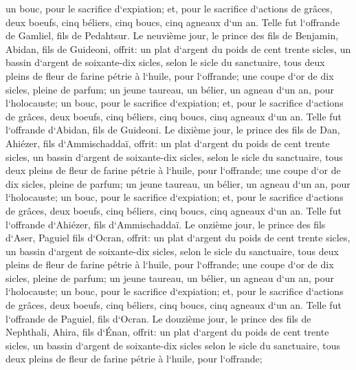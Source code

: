 \verse un bouc, pour le sacrifice d`expiation; 
\verse et, pour le sacrifice d`actions de grâces, deux boeufs, cinq béliers, cinq boucs, cinq agneaux d`un an. Telle fut l`offrande de Gamliel, fils de Pedahtsur. 
\verse Le neuvième jour, le prince des fils de Benjamin, Abidan, fils de Guideoni, 
\verse offrit: un plat d`argent du poids de cent trente sicles, un bassin d`argent de soixante-dix sicles, selon le sicle du sanctuaire, tous deux pleins de fleur de farine pétrie à l`huile, pour l`offrande; 
\verse une coupe d`or de dix sicles, pleine de parfum; 
\verse un jeune taureau, un bélier, un agneau d`un an, pour l`holocauste; 
\verse un bouc, pour le sacrifice d`expiation; 
\verse et, pour le sacrifice d`actions de grâces, deux boeufs, cinq béliers, cinq boucs, cinq agneaux d`un an. Telle fut l`offrande d`Abidan, fils de Guideoni. 
\verse Le dixième jour, le prince des fils de Dan, Ahiézer, fils d`Ammischaddaï, 
\verse offrit: un plat d`argent du poids de cent trente sicles, un bassin d`argent de soixante-dix sicles, selon le sicle du sanctuaire, tous deux pleins de fleur de farine pétrie à l`huile, pour l`offrande; 
\verse une coupe d`or de dix sicles, pleine de parfum; 
\verse un jeune taureau, un bélier, un agneau d`un an, pour l`holocauste; 
\verse un bouc, pour le sacrifice d`expiation; 
\verse et, pour le sacrifice d`actions de grâces, deux boeufs, cinq béliers, cinq boucs, cinq agneaux d`un an. Telle fut l`offrande d`Ahiézer, fils d`Ammischaddaï. 
\verse Le onzième jour, le prince des fils d`Aser, Paguiel fils d`Ocran, 
\verse offrit: un plat d`argent du poids de cent trente sicles, un bassin d`argent de soixante-dix sicles, selon le sicle du sanctuaire, tous deux pleins de fleur de farine pétrie à l`huile, pour l`offrande; 
\verse une coupe d`or de dix sicles, pleine de parfum; 
\verse un jeune taureau, un bélier, un agneau d`un an, pour l`holocauste; 
\verse un bouc, pour le sacrifice d`expiation; 
\verse et, pour le sacrifice d`actions de grâces, deux boeufs, cinq béliers, cinq boucs, cinq agneaux d`un an. Telle fut l`offrande de Paguiel, fils d`Ocran. 
\verse Le douzième jour, le prince des fils de Nephthali, Ahira, fils d`Énan, 
\verse offrit: un plat d`argent du poids de cent trente sicles, un bassin d`argent de soixante-dix sicles selon le sicle du sanctuaire, tous deux pleins de fleur de farine pétrie à l`huile, pour l`offrande; 
